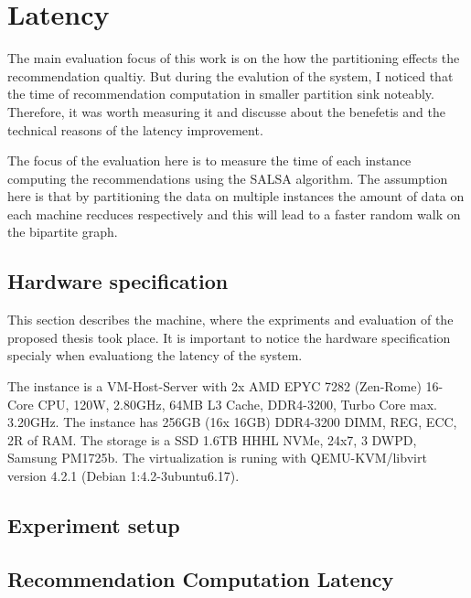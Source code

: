 \section{Latency}
\label{sec:eval-latency}
The main evaluation focus of this work is on the how the partitioning effects the recommendation qualtiy. But during the evalution of the system, I noticed that the time of recommendation computation in smaller partition sink noteably. Therefore, it was worth measuring it and discusse about the benefetis and the technical reasons of the latency improvement.


The focus of the evaluation here is to measure the time of each instance computing the recommendations using the SALSA algorithm. The assumption here is that by partitioning the data on multiple instances the amount of data on each machine recduces respectively and this will lead to a faster random walk on the bipartite graph. 

\subsection{Hardware specification}
\label{subsec:hardware-spec}
This section describes the machine, where the expriments and evaluation of the proposed thesis took place. It is important to notice the hardware specification specialy when evaluationg the latency of the system.

The instance is a VM-Host-Server with 2x AMD EPYC 7282 (Zen-Rome) 16-Core CPU, 120W, 2.80GHz, 64MB L3 Cache, DDR4-3200, Turbo Core max. 3.20GHz. The instance has 256GB (16x 16GB) DDR4-3200 DIMM, REG, ECC, 2R of RAM. The storage is a SSD 1.6TB HHHL NVMe, 24x7, 3 DWPD, Samsung PM1725b. The virtualization is runing with  QEMU-KVM/libvirt version 4.2.1 (Debian 1:4.2-3ubuntu6.17).


\subsection{Experiment setup}
\label{subsec:latency-experiment-setup}

\subsection{Recommendation Computation Latency}
\label{subsec:recommendation-computation-latency}


